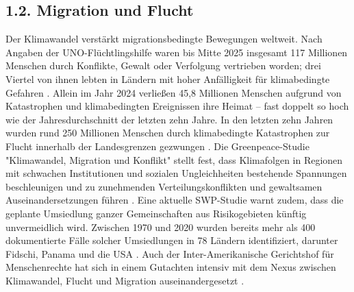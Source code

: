 \documentclass[12pt, a4paper]{article}
\begin{document}
	\subsection*{1.2. Migration und Flucht}
	Der Klimawandel verstärkt migrationsbedingte Bewegungen weltweit. Nach Angaben der
	UNO-Flüchtlingshilfe waren bis Mitte 2025 insgesamt 117 Millionen Menschen durch
	Konflikte, Gewalt oder Verfolgung vertrieben worden;
	drei Viertel von ihnen lebten in
	Ländern mit hoher Anfälligkeit für klimabedingte Gefahren \cite{unhcr2025}.
	Allein
	im Jahr 2024 verließen 45,8 Millionen Menschen aufgrund von Katastrophen und
	klimabedingten Ereignissen ihre Heimat – fast doppelt so hoch wie der Jahresdurchschnitt
	der letzten zehn Jahre.
	In den letzten zehn Jahren wurden rund 250 Millionen Menschen
	durch klimabedingte Katastrophen zur Flucht innerhalb der Landesgrenzen gezwungen
	\cite{idmc2025}.
	Die Greenpeace-Studie "Klimawandel, Migration und Konflikt" stellt
	fest, dass Klimafolgen in Regionen mit schwachen Institutionen und sozialen
	Ungleichheiten bestehende Spannungen beschleunigen und zu zunehmenden
	Verteilungskonflikten und gewaltsamen Auseinandersetzungen führen \cite{greenpeace2025}.
	Eine aktuelle SWP-Studie warnt zudem, dass die geplante Umsiedlung ganzer
	Gemeinschaften aus Risikogebieten künftig unvermeidlich wird.
	Zwischen 1970 und 2020
	wurden bereits mehr als 400 dokumentierte Fälle solcher Umsiedlungen in 78 Ländern
	identifiziert, darunter Fidschi, Panama und die USA \cite{swp2025}.
	Auch der
	Inter-Amerikanische Gerichtshof für Menschenrechte hat sich in einem Gutachten
	intensiv mit dem Nexus zwischen Klimawandel, Flucht und Migration auseinandergesetzt
	\cite{iachr2025}.
	
\end{document}

